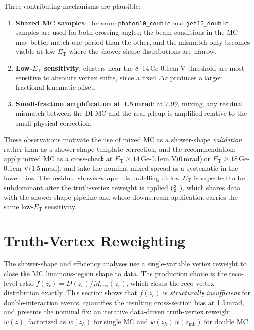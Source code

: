 \documentclass[11pt,a4paper]{article}
\newcommand{\ET}{\ensuremath{E_{\text{T}}}\xspace}
\newcommand{\GeV}{\ifmmode {\mathrm{\ Ge\kern -0.1em V}}\else\textrm{Ge\kern -0.1em V}\fi\xspace}
\begin{document}
Three contributing mechanisms are plausible:
\begin{enumerate}
\item \textbf{Shared MC samples}: the same
  \texttt{photon10\_double} and \texttt{jet12\_double} samples are
  used for both crossing angles; the beam conditions in the MC may
  better match one period than the other, and the mismatch only
  becomes visible at low \ET where the shower-shape distributions
  are narrow.
\item \textbf{Low-\ET sensitivity}: clusters near the 8--14\,\GeV
  threshold are most sensitive to absolute vertex shifts, since
  a fixed $\Delta z$ produces a larger fractional kinematic offset.
\item \textbf{Small-fraction amplification at 1.5\,mrad}: at 7.9\%
  mixing, any residual mismatch between the DI MC and the real
  pileup is amplified relative to the small physical correction.
\end{enumerate}

These observations motivate the use of mixed MC as a shower-shape
\emph{validation} rather than as a shower-shape template correction,
and the recommendation: apply mixed MC as a cross-check at
$\ET\geq 14$\,\GeV (0\,mrad) or $\ET\geq 18$\,\GeV (1.5\,mrad), and
take the nominal-mixed spread as a systematic in the lower bins.
The residual shower-shape mismodelling at low \ET is expected to be
subdominant after the truth-vertex reweight is applied
(\S\ref{sec:truth_vertex}), which shares data with the shower-shape
pipeline and whose downstream application carries the same low-\ET
sensitivity.


\section{Truth-Vertex Reweighting}
\label{sec:truth_vertex}

The shower-shape and efficiency analyses use a single-variable
vertex reweight to close the MC luminous-region shape to data. The
production choice is the reco-level ratio
$f(z_r) = D(z_r)/M_{\mathrm{reco}}(z_r)$, which closes the
reco-vertex distribution exactly. This section shows that $f(z_r)$
is \emph{structurally insufficient} for double-interaction events,
quantifies the resulting cross-section bias at 1.5\,mrad, and
presents the nominal fix: an iterative data-driven truth-vertex
reweight $w(z)$, factorized as $w(z_h)$ for single MC and
$w(z_h)\,w(z_\mathrm{mb})$ for double MC.
\end{document}
